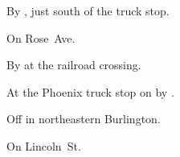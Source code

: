 
\begin{LocationList}

By , just south of the truck stop.

On  Rose~Ave.

By  at the railroad crossing.

At the Phoenix truck stop on  by  .

Off  in northeastern Burlington.

On  Lincoln~St.

\end{LocationList}
